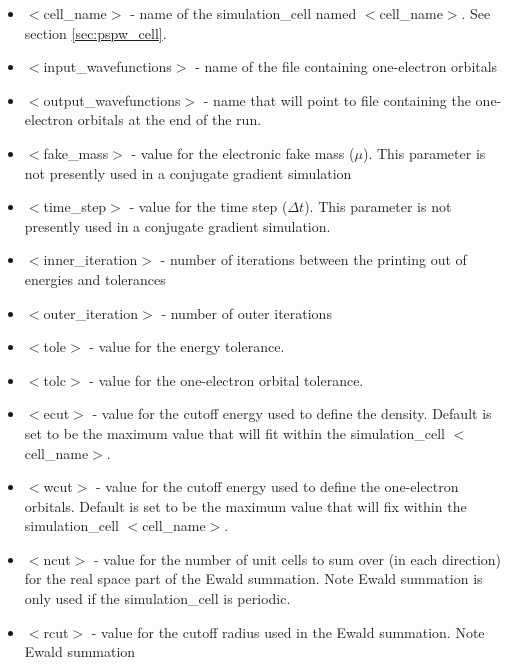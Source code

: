 \begin{itemize}
        \item $<$cell\_name$>$ - name of
              the simulation\_cell named $<$cell\_name$>$.  See section \ref{sec:pspw_cell}.
        \item $<$input\_wavefunctions$>$ - name of the
              file containing one-electron orbitals
        \item $<$output\_wavefunctions$>$ - name that will
              point to file containing the one-electron orbitals at the
              end of the run. 
        \item $<$fake\_mass$>$ - value for the electronic
              fake mass ($\mu$). This parameter is not presently used in a 
              conjugate gradient simulation
        \item $<$time\_step$>$ - value for the time step ($\Delta t$).  This
              parameter is not presently used in a conjugate gradient simulation.
        \item $<$inner\_iteration$>$ - number of iterations between the 
              printing out of energies and tolerances
        \item $<$outer\_iteration$>$ - number of outer iterations
        \item $<$tole$>$ - value for the energy tolerance.
        \item $<$tolc$>$ - value for the one-electron orbital tolerance.
        \item $<$ecut$>$ - value for the cutoff energy used
                           to define the density. Default is set
                           to be the maximum value that will fit
                            within the simulation\_cell $<$cell\_name$>$.
        \item $<$wcut$>$ - value for the cutoff energy used
                           to define the one-electron orbitals.
                           Default is set to be the maximum value that 
                           will fix within the simulation\_cell $<$cell\_name$>$.
        \item $<$ncut$>$ - value for the number of unit cells
                          to sum over (in each direction) for the real space
                          part of the Ewald summation. Note Ewald summation
                          is only used if the simulation\_cell is periodic.
        \item $<$rcut$>$ - value for the cutoff radius used
                          in the Ewald summation. Note Ewald summation

\end{itemize}
